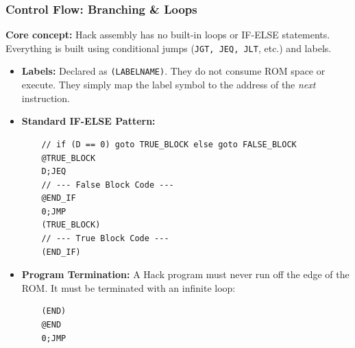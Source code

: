 \documentclass[12pt,a4paper]{article}
\begin{document}
\subsubsection*{Control Flow: Branching \& Loops}
\textbf{Core concept:} Hack assembly has no built-in loops or IF-ELSE statements. Everything is built using conditional jumps (\texttt{JGT, JEQ, JLT}, etc.) and labels.
\begin{itemize}
    \item \textbf{Labels:} Declared as \texttt{(LABELNAME)}. They do not consume ROM space or execute. They simply map the label symbol to the address of the \textit{next} instruction.
    \item \textbf{Standard IF-ELSE Pattern:}
    \begin{verbatim}
    // if (D == 0) goto TRUE_BLOCK else goto FALSE_BLOCK
    @TRUE_BLOCK
    D;JEQ
    // --- False Block Code ---
    @END_IF
    0;JMP
    (TRUE_BLOCK)
    // --- True Block Code ---
    (END_IF)
    \end{verbatim}
    \item \textbf{Program Termination:} A Hack program must never run off the edge of the ROM. It must be terminated with an infinite loop:
    \begin{verbatim}
    (END)
    @END
    0;JMP
    \end{verbatim}
\end{itemize}
\end{document}
